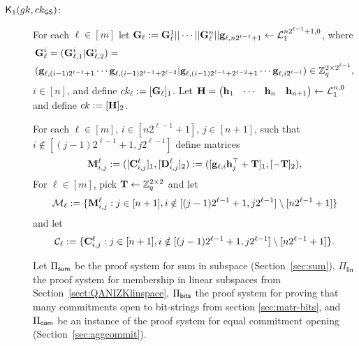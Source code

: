 \begin{description}

\item[{\(\mathsf{K}_1({gk}, ck_{\mathsf{GS}})\)}:]
For each \(\ell\in [m]\) let \(\mathbf{{G}}_\ell:=\mathbf{{G}}^1_{\ell}||\cdots||\mathbf{{G}}^n_{\ell}||\mathbf{g}_{\ell,{n2^{\ell-1}+1}}\gets\mathcal{L}_1^{n2^{\ell-1}+1,0}\), where
\begin{align*}
&\mathbf{{G}}^i_{\ell}=
(\mathbf{{G}}^i_{\ell,1}|\mathbf{{G}}^i_{\ell,2})
=\\
&(\mathbf{g}_{\ell,(i-1)2^{\ell-1}+1}\cdots\mathbf{g}_{\ell, (i-1) 2^{\ell-1}+2^{\ell-2}}|\mathbf{g}_{\ell,(i-1)2^{\ell-1}+2^{\ell-2}+1}\cdots\mathbf{g}_{\ell,i2^{\ell-1}})
\in\mathbb{Z}_q^{2\times 2^{\ell-1}},
\end{align*}
 \(i\in  [n]\), and define \(ck_\ell:=[\mathbf{{G}}_\ell]_1\).
Let \(\mathbf{{H}}=\begin{pmatrix}\mathbf{h}_1&\cdots&\mathbf{h}_n&\mathbf{h}_{n+1}\end{pmatrix}\gets\mathcal{L}_1^{n,0}\) and define \(ck:=[\mathbf{{H}}]_2\). 

For each \(\ell\in[m]\), \( i\in [n2^{\ell-1}+1]\), \(j\in  [n+1]\), such that \(i\notin [(j-1)2^{\ell-1}+1,j2^{\ell-1}]\) define matrices
\[\mathbf{{M}}^\ell_{i,j}:=([\mathbf{{C}}_{i,j}^\ell]_1,[\mathbf{{D}}_{i,j}^\ell]_2):=([\mathbf{g}_{\ell,i}\mathbf{h}_j^{\top}+\mathbf{{T}}]_1,[-\mathbf{{T}}]_2),\]
For \(\ell\in [m]\), pick \(\mathbf{{T}}\gets\mathbb{Z}_q^{2\times 2}\) and let
$$
\mathcal{M}_\ell:=\{\mathbf{{M}}^\ell_{i,j}:j\in[n+1],i\notin[(j-1)2^{\ell-1}+1,j2^{\ell-1}]\setminus[n2^{\ell-1}+1]\}$$
and let
$$
\mathcal{C}_\ell:=\{\mathbf{{C}}^\ell_{i,j}:j\in[n+1],i\notin[(j-1)2^{\ell-1}+1,j2^{\ell-1}]\setminus[n2^{\ell-1}+1]\}.
$$

Let \(\Pi_{\mathsf{sum}}\) be the proof system for sum in subspace 
(Section~\ref{sec:sum}), \(\Pi_\mathsf{lin}\) the proof system for membership in linear subspaces from Section~\ref{sect:QANIZKlinspace}, \(\Pi_{\mathsf{bits}}\) the proof system for proving that many commitments open to bit-strings from section \ref{sec:matr-bits}, and \(\Pi_{\mathsf{com}}\)
be an instance of the proof system for equal commitment opening (Section~\ref{sec:aggcommit}).


\end{description}
